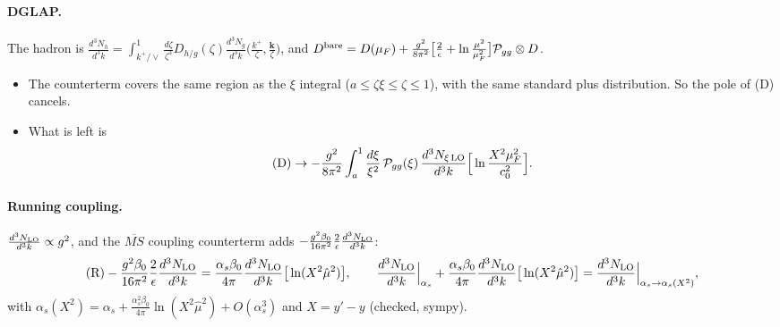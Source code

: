 \documentclass[10pt]{article}
\numberwithin{equation}{section}
\newcommand{\MSb}{\overline{MS}}
\newcommand{\NLO}[1]{\frac{d^3N_{#1}}{d^3k}}
\begin{document}
\paragraph{DGLAP.} The hadron is $\NLO{h}=\int_{k^+/\vee}^1\frac{d\zeta}{\zeta^3}D_{h/g}(\zeta)\NLO{g}\big(\frac{k^+}{\zeta},\frac{\mathbf k}{\zeta}\big)$, and $D^{\rm bare}=D(\mu_F)+\frac{g^2}{8\pi^2}\big[\frac2\epsilon+\ln\frac{\mu^2}{\mu_F^2}\big]\mathcal P_{gg}\otimes D$.
\begin{itemize}
\item The counterterm covers the same region as the $\xi$ integral ($a\le\zeta\xi\le\zeta\le1$), with the same standard plus distribution. So the pole of (D) cancels.
\item What is left is
\begin{equation}
{\rm (D)}\to-\frac{g^2}{8\pi^2}\int_a^1\frac{d\xi}{\xi^2}\,\mathcal P_{gg}(\xi)\,\NLO{\xi\,\rm LO}\Big[\ln\frac{X^2\mu_F^2}{c_0^2}\Big].
\end{equation}
\end{itemize}
\paragraph{Running coupling.} $\NLO{\rm LO}\propto g^2$, and the $\MSb$ coupling counterterm adds $-\frac{g^2\beta_0}{16\pi^2}\frac2\epsilon\NLO{\rm LO}$:
\begin{equation}
{\rm (R)}-\frac{g^2\beta_0}{16\pi^2}\frac2\epsilon\NLO{\rm LO}=\frac{\alpha_s\beta_0}{4\pi}\NLO{\rm LO}\big[\ln(X^2\hat\mu^2)\big],\qquad
\NLO{\rm LO}\Big|_{\alpha_s}+\frac{\alpha_s\beta_0}{4\pi}\NLO{\rm LO}\big[\ln(X^2\hat\mu^2)\big]=\NLO{\rm LO}\Big|_{\alpha_s\to\alpha_s(X^2)},
\end{equation}
with $\alpha_s(X^2)=\alpha_s+\frac{\alpha_s^2\beta_0}{4\pi}\ln(X^2\hat\mu^2)+O(\alpha_s^3)$ and $X=y'-y$ (checked, sympy).
\end{document}
